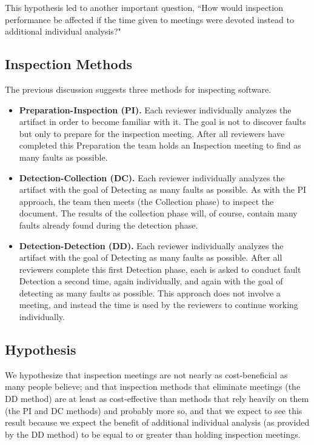This hypothesis led to another important question, ``How would inspection 
performance be affected if the time given to
meetings were devoted instead to additional individual analysis?" 


\subsection{Inspection Methods}


The previous discussion suggests three methods for inspecting software.

\begin{itemize}
\item {\bf Preparation-Inspection (PI).}  Each reviewer individually analyzes the 
artifact in order to become familiar with it.  The goal is not to 
discover faults but only to prepare for the inspection meeting. 
After all reviewers have completed this 
Preparation the team holds an Inspection meeting to 
find as many faults as possible.

\item {\bf Detection-Collection (DC).} Each reviewer individually analyzes the
artifact with the goal of Detecting as many faults as possible. As with
the PI approach, the team then meets (the Collection phase) to inspect the
document. The results of the collection phase will, of course, contain many
faults already found during the detection phase.

\item {\bf Detection-Detection (DD).}  Each reviewer individually analyzes the
artifact with the goal of Detecting as many faults as possible. After all 
reviewers complete this first Detection phase, each is asked to conduct fault 
Detection a second time, again individually, and again with the goal of 
detecting as many faults as possible.
This approach does not involve a meeting, and instead 
the time is used by the reviewers to continue working individually.   

\end{itemize}

\subsection{Hypothesis} 

We hypothesize that inspection meetings are not nearly as cost-beneficial as 
many people believe; and that inspection methods that eliminate meetings
(the DD method) are at least as cost-effective than methods that rely heavily 
on them (the PI and DC methods) and probably more so, and that we expect to
see this result because we expect the benefit of 
additional individual analysis (as provided by the DD method)
to be equal to or greater than holding inspection meetings.
